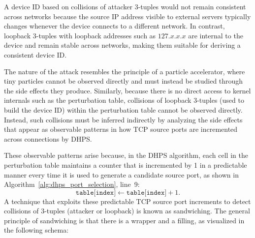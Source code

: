 \documentclass{report}
\begin{document}
A device ID based on collisions of \alert{attacker 3-tuples} would not remain consistent across networks because the source IP address visible to external servers typically changes whenever the device connects to a different network. In contrast, \alert{loopback 3-tuples} with loopback addresses such as $127.x.x.x$ are internal to the device and remain stable across networks, making them suitable for deriving a consistent device ID.

The nature of the attack resembles the principle of a \alert{particle accelerator}, where tiny particles cannot be observed directly and must instead be studied through the side effects they produce. Similarly, because there is no direct access to kernel internals such as the perturbation table, collisions of loopback 3-tuples (used to build the device ID) within the perturbation table \alert{cannot be observed directly}. Instead, such collisions must be inferred indirectly by analyzing the side effects that appear as observable patterns in how TCP source ports are incremented across connections by DHPS.

These observable patterns arise because, in the DHPS algorithm, each cell in the perturbation table maintains a counter that is incremented by 1 in a predictable manner every time it is used to generate a candidate source port, as shown in Algorithm~\ref{alg:dhps_port_selection}, line~9:
\[
\texttt{table[index]} \leftarrow \texttt{table[index]} + 1.
\]
A technique that exploits these predictable TCP source port increments to detect collisions of 3-tuples (attacker or loopback) is known as \alert{sandwiching}. The general principle of sandwiching is that there is a \alert{wrapper} and a \alert{filling}, as visualized in the following schema:
\end{document}
